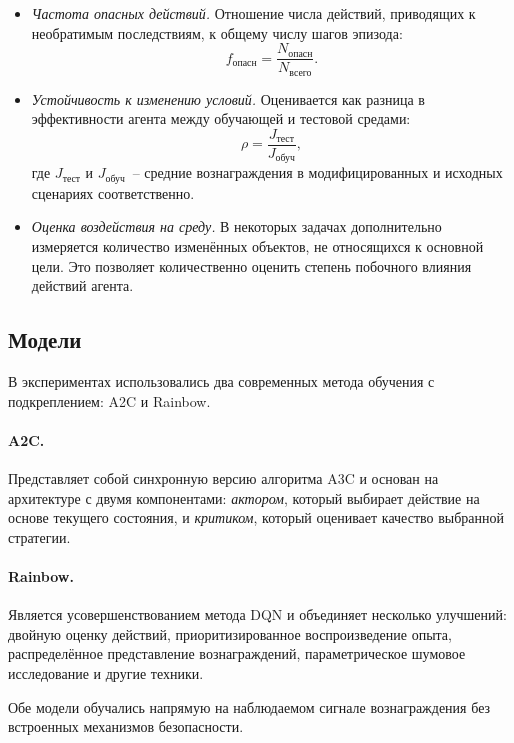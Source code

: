 \begin{itemize}
    \item \emph{Частота опасных действий.}  
    Отношение числа действий, приводящих к необратимым последствиям, к общему числу шагов эпизода:
    \begin{equation}
        f_{\text{опасн}} = \frac{N_{\text{опасн}}}{N_{\text{всего}}}.
    \end{equation}

    \item \emph{Устойчивость к изменению условий.}  
    Оценивается как разница в эффективности агента между обучающей и тестовой средами:
    \begin{equation}
        \rho = \frac{J_{\text{тест}}}{J_{\text{обуч}}},
    \end{equation}
    где $J_{\text{тест}}$ и $J_{\text{обуч}}$~-- средние вознаграждения в модифицированных и исходных сценариях соответственно. 

    \item \emph{Оценка воздействия на среду.}  
    В некоторых задачах дополнительно измеряется количество изменённых объектов, не относящихся к основной цели. Это позволяет количественно оценить степень побочного влияния действий агента.
\end{itemize}


\subsection{Модели}


В экспериментах использовались два современных метода обучения с подкреплением: A2C и Rainbow.  

\paragraph{A2C.} Представляет собой синхронную версию алгоритма A3C и основан на архитектуре с двумя компонентами: \emph{актором}, который выбирает действие на основе текущего состояния, и \emph{критиком}, который оценивает качество выбранной стратегии.  

\paragraph{Rainbow.} Является усовершенствованием метода DQN и объединяет несколько улучшений: двойную оценку действий, приоритизированное воспроизведение опыта, распределённое представление вознаграждений, параметрическое шумовое исследование и другие техники.  

Обе модели обучались напрямую на наблюдаемом сигнале вознаграждения без встроенных механизмов безопасности. 

